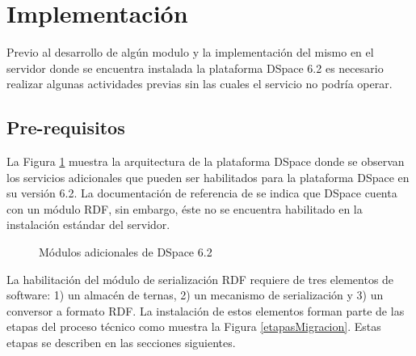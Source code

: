 \section{Implementaci\'on}

Previo al desarrollo de alg\'un modulo y la implementaci\'on del mismo en el servidor donde se encuentra instalada la plataforma DSpace 6.2 es necesario realizar algunas actividades previas sin las cuales el servicio no podr\'ia operar.

\subsection{Pre-requisitos}

La Figura \ref{adicionalesDspace} muestra la arquitectura de la plataforma DSpace donde se observan los servicios adicionales que pueden ser habilitados para la plataforma DSpace en su versi\'on 6.2. La documentaci\'on de referencia de \cite{DSpaceRef} se indica que DSpace cuenta con un m\'odulo RDF, sin embargo, \'este no se encuentra habilitado en la instalaci\'on est\'andar del servidor.\newline

\begin{figure}[!ht]
	\centering
    \caption{M\'odulos adicionales de DSpace 6.2} %
    \label{adicionalesDspace}
\end{figure}

La habilitaci\'on del m\'odulo de serializaci\'on RDF requiere de tres elementos de software: 1) un almac\'en de ternas, 2) un mecanismo de serializaci\'on y 3) un conversor a formato RDF. La instalaci\'on de estos elementos forman parte de las etapas del proceso t\'ecnico como muestra la Figura \ref{etapasMigracion}. Estas etapas se describen en las secciones siguientes.

